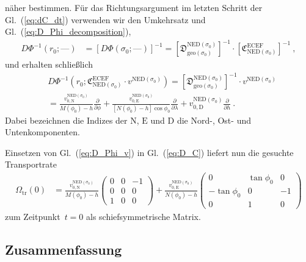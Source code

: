 \documentclass[10pt,a4paper]{article}
\newcommand{\nul}{\textrm{---}}
\begin{document}
näher bestimmen.
Für das Richtungsargument im letzten Schritt der Gl.~(\ref{eq:dC_dt}) verwenden wir den Umkehrsatz und Gl.~(\ref{eq:D_Phi_decomposition}),
\begin{align}
	D\Phi^{-1}(r_0; \nul)
	&=
	\left[
		D\Phi(\sigma_0; \nul)
	\right]^{-1} 
	=
	\left[
		\mathfrak{D}^{\mathrm{NED}(\sigma_0)}_{\mathrm{geo}(\sigma_0)}
	\right]^{-1}
	\cdot
	\left[
		\mathfrak{C}^{\mathrm{ECEF}}_{\mathrm{NED}(\sigma_0)}
	\right]^{-1}
	\ ,
\end{align}
und erhalten schließlich
\begin{align}
\label{eq:D_Phi_v}
	&D\Phi^{-1}\left(r_0; 	
	\mathfrak{C}^{\mathrm{ECEF}}_{\mathrm{NED}(\sigma_0)}
	\cdot
	v^{\mathrm{NED}(\sigma_0)}
	\right)
	=
	\left[
		\mathfrak{D}^{\mathrm{NED}(\sigma_0)}_{\mathrm{geo}(\sigma_0)}
	\right]^{-1}
	\cdot
	v^{\mathrm{NED}(\sigma_0)}
	\nonumber\\
	&=
	\frac{v_{0,\mathrm{N}}^{\mathrm{NED}(\sigma_0)}}
	     {M(\phi_0) - h}
	\frac{\partial}{\partial\phi}
	+
	\frac{v_{0,\mathrm{E}}^{\mathrm{NED}(\sigma_0)}}
	     {[N(\phi_0) - h]\cos\phi_0}
	\frac{\partial}{\partial\lambda}
	+
	v_{0,\mathrm{D}}^{\mathrm{NED}(\sigma_0)}
	\frac{\partial}{\partial h}
	\ .
\end{align}
Dabei bezeichnen die Indizes der  $\mathrm{N}$, $\mathrm{E}$ und $\mathrm{D}$ die Nord-, Ost- und Untenkomponenten.

Einsetzen von Gl.~(\ref{eq:D_Phi_v}) in Gl.~(\ref{eq:D_C}) liefert nun die gesuchte Transportrate
\begin{align}
	\Omega_{\mathrm{tr}}(0)
	&=
	\frac{v_{0,\mathrm{N}}^{\mathrm{NED}(\sigma_0)}}
         {M(\phi_0) - h}
	\begin{pmatrix}
		0 & 0 & -1\\
		0 & 0 & 0 \\
		1 & 0 & 0
	\end{pmatrix}
	+
	\frac{v_{0,\mathrm{E}}^{\mathrm{NED}(\sigma_0)}}
         {N(\phi_0) - h}
	\begin{pmatrix}
		0 & \tan\phi_0 & 0 \\
		-\tan\phi_0 & 0 & -1 \\
		0 & 1 & 0
	\end{pmatrix}
\end{align}
zum Zeitpunkt~$t=0$ als schiefsymmetrische Matrix.

\subsection{Zusammenfassung}
\end{document}
